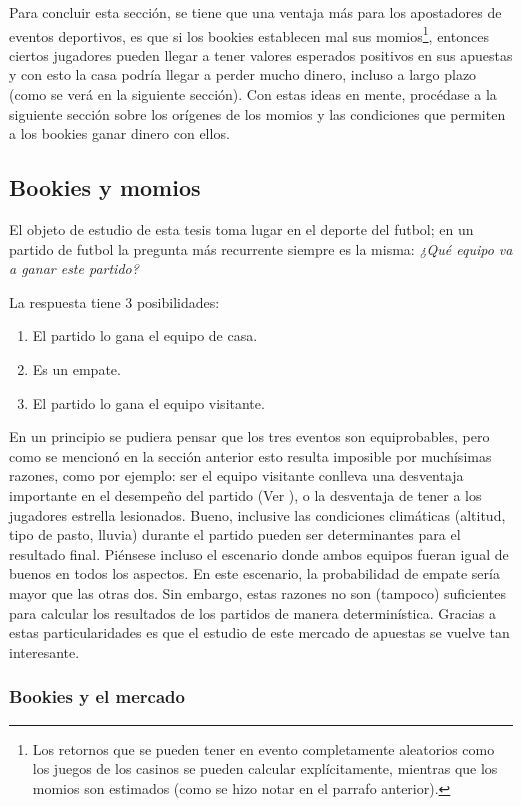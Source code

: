 Para concluir esta sección, se tiene que una ventaja más para los apostadores de eventos deportivos, es que si los bookies establecen mal sus momios\footnote{Los retornos que se pueden tener en evento completamente aleatorios como los juegos de los casinos se pueden calcular explícitamente, mientras que los momios son estimados (como se hizo notar en el parrafo anterior).}, entonces ciertos jugadores pueden llegar a tener valores esperados positivos en sus apuestas y con esto la casa podría llegar a perder mucho dinero, incluso a largo plazo (como se verá en la siguiente sección). Con estas ideas en mente, procédase a la siguiente sección sobre los orígenes de los momios y las condiciones que permiten a los bookies ganar dinero con ellos.


\subsection{Bookies y momios}

El objeto de estudio de esta tesis toma lugar en el deporte del futbol; en un partido de futbol la pregunta más recurrente siempre es la misma: \emph{¿Qué equipo va a ganar este partido?}

La respuesta tiene $3$ posibilidades:
\begin{enumerate}
	\item El partido lo gana el equipo de casa.
	\item Es un empate.
	\item El partido lo gana el equipo visitante.
\end{enumerate}
En un principio se pudiera pensar que los tres eventos son equiprobables, pero como se mencionó en la sección anterior esto resulta imposible por muchísimas razones, como por ejemplo: ser el equipo visitante conlleva una desventaja importante en el desempeño del partido (Ver \cite{roffe2007crisis}), o la desventaja de tener a los jugadores estrella lesionados. Bueno, inclusive las condiciones climáticas (altitud, tipo de pasto, lluvia) durante el partido pueden ser determinantes para el resultado final. Piénsese incluso el escenario donde ambos equipos fueran igual de buenos en todos los aspectos. En este escenario, la probabilidad de empate sería mayor que las otras dos. Sin embargo, estas razones no son (tampoco) suficientes para calcular los resultados de los partidos de manera determinística. Gracias a estas particularidades es que el estudio de este mercado de apuestas se vuelve tan interesante.

\subsubsection{Bookies y el mercado}

